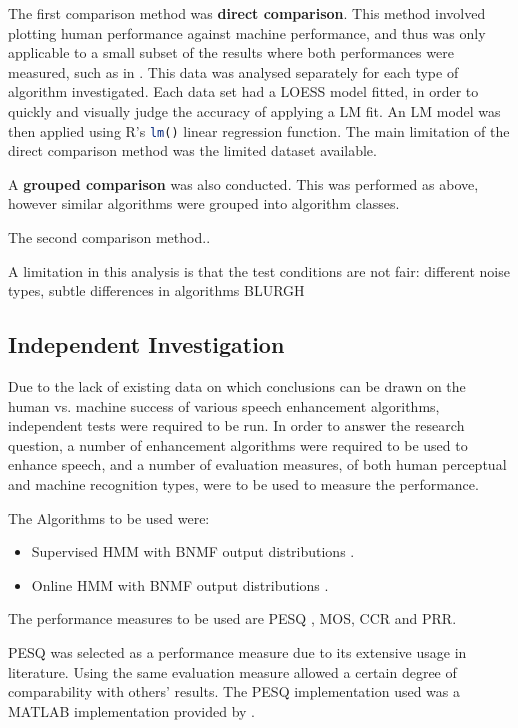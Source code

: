The first comparison method was \textbf{direct comparison}. This method
involved plotting human performance against machine performance, and
thus was only applicable to a small subset of the results where both
performances were measured, such as in \citep{Paliwal2010}. This
data was analysed separately for each type of algorithm investigated.
Each data set had a \ac{LOESS} model fitted, in order to quickly
and visually judge the accuracy of applying a \ac{LM} fit. An \ac{LM}
model was then applied using R's \lstinline[language=R]!lm()! linear
regression function. The main limitation of the direct comparison
method was the limited dataset available.

A \textbf{grouped comparison} was also conducted. This was performed
as above, however similar algorithms were grouped into algorithm classes.

The second comparison method..

A limitation in this analysis is that the test conditions are not
fair: different noise types, subtle differences in algorithms BLURGH


\subsection{Independent Investigation}

Due to the lack of existing data on which conclusions can be drawn
on the human vs. machine success of various speech enhancement algorithms,
independent tests were required to be run. In order to answer the
research question, a number of enhancement algorithms were required
to be used to enhance speech, and a number of evaluation measures,
of both human perceptual and machine recognition types, were to be
used to measure the performance.

The Algorithms to be used were:
\begin{itemize}
\item Supervised \ac{HMM} with \ac{BNMF} output distributions \citep{mohammadiha2013supervised}.
\item Online \ac{HMM} with \ac{BNMF} output distributions \citep{mohammadiha2013supervised}.
\end{itemize}
The performance measures to be used are \ac{PESQ} \citep{InternationalTelecommunicationUnion2001},
\ac{MOS}, \ac{CCR} \citep{InternationalTelecommunicationUnion1996}
and \ac{PRR}.

\ac{PESQ} was selected as a performance measure due to its extensive
usage in literature. Using the same evaluation measure allowed a certain
degree of comparability with others' results. The \ac{PESQ} implementation
used was a MATLAB implementation provided by \citet{Loizou2008}.

